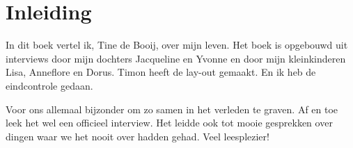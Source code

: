 

\chapter{Inleiding} 

In dit boek vertel ik, Tine de Booij, over mijn leven.
Het boek is opgebouwd uit interviews door mijn dochters Jacqueline en Yvonne en door mijn kleinkinderen Lisa, Anneflore en Dorus. Timon heeft de lay-out gemaakt. En ik heb de eindcontrole gedaan.

Voor ons allemaal bijzonder om zo samen in het verleden te graven.
Af en toe leek het wel een officieel interview.
Het leidde ook tot mooie gesprekken over dingen waar we het nooit over hadden gehad.
Veel leesplezier!